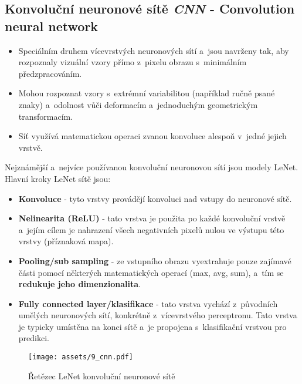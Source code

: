 \subsection{Konvoluční neuronové sítě \textit{CNN} - Convolution neural network}
\begin{itemize}
    \item Speciálním druhem vícevrstvých neuronových sítí a~jsou navrženy tak, aby rozpoznaly vizuální vzory přímo z~pixelu obrazu s~minimálním předzpracováním.
    \item Mohou rozpoznat vzory s~extrémní variabilitou (například ručně psané znaky) a~odolnost vůči deformacím a~jednoduchým geometrickým transformacím.
    \item Síť využívá matematickou operaci zvanou konvoluce alespoň v~jedné jejich vrstvě.
\end{itemize}

Nejznámější a~nejvíce používanou konvoluční neuronovou sítí jsou modely LeNet.
Hlavní kroky LeNet sítě jsou:
\begin{itemize}
    \item{\textbf{Konvoluce} - tyto vrstvy provádějí konvoluci nad vstupy do neuronové sítě.}
    \item{\textbf{Nelinearita (ReLU)} - tato vrstva je použita po každé konvoluční vrstvě a~jejím cílem je nahrazení všech negativních pixelů nulou ve výstupu této vrstvy (příznaková mapa).}
    \item{\textbf{Pooling/sub sampling} - ze vstupního obrazu vyextrahuje pouze zajímavé části pomocí některých matematických operací (max, avg, sum), a~tím se \textbf{redukuje jeho dimenzionalita}.}
    \item{\textbf{Fully connected layer/klasifikace} - tato vrstva vychází z~původních umělých neuronových sítí, konkrétně z~vícevrstvého perceptronu. Tato vrstva je typicky umístěna na konci sítě a~je propojena s~klasifikační vrstvou pro predikci.}
\end{itemize}
\begin{figure}[H]
    \centering
    \texttt{[image: assets/9\_cnn.pdf]}
    \caption{Řetězec LeNet konvoluční neuronové sítě}
    \label{fig:cnn}
\end{figure}